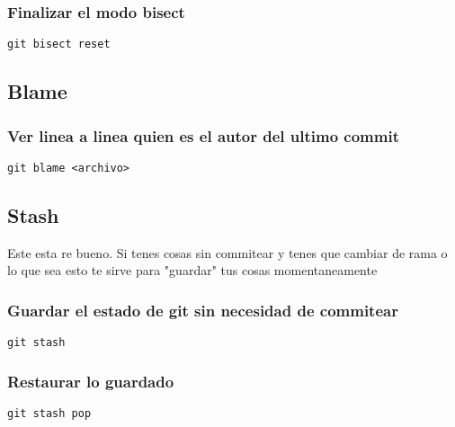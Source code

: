 \documentclass[11pt]{article}
\begin{document}
\subsubsection{Finalizar el modo bisect}
\label{sec:org7450a1c}
\begin{verbatim}
git bisect reset
\end{verbatim}

\subsection{Blame}
\label{sec:orgf9bc21f}
\subsubsection{Ver linea a linea quien es el autor del ultimo commit}
\label{sec:orgb8b542f}
\begin{verbatim}
git blame <archivo>
\end{verbatim}

\subsection{Stash}
\label{sec:org5cff059}
Este esta re bueno. Si tenes cosas sin commitear y tenes que cambiar de rama o lo que sea esto te sirve para "guardar" tus cosas momentaneamente
\subsubsection{Guardar el estado de git sin necesidad de commitear}
\label{sec:org3db7bd8}
\begin{verbatim}
git stash
\end{verbatim}

\subsubsection{Restaurar lo guardado}
\label{sec:org5fa1590}
\begin{verbatim}
git stash pop
\end{verbatim}
\end{document}
